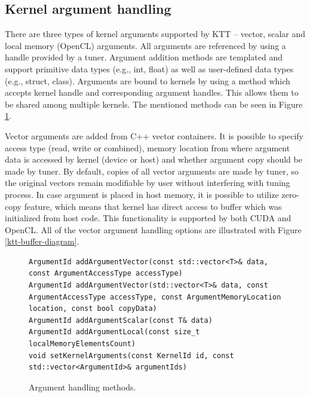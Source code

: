 \documentclass
[
    digital, %
    oneside, %
    table, %
    nolof, %
    nolot, %
    nocover %
]{fithesis3}
\begin{document}
\subsection{Kernel argument handling}
There are three types of kernel arguments supported by KTT -- vector, scalar and local memory (OpenCL) arguments. All arguments are referenced by using
a handle provided by a tuner. Argument addition methods are templated and support primitive data types (e.g., int, float) as well as user-defined data
types (e.g., struct, class). Arguments are bound to kernels by using a method which accepts kernel handle and corresponding argument handles. This allows
them to be shared among multiple kernels. The mentioned methods can be seen in Figure \ref{ktt-argument-methods}.

Vector arguments are added from C++ vector containers. It is possible to specify access type (read, write or combined), memory location from where
argument data is accessed by kernel (device or host) and whether argument copy should be made by tuner. By default, copies of all vector arguments
are made by tuner, so the original vectors remain modifiable by user without interfering with tuning process. In case argument is placed in host
memory, it is possible to utilize zero-copy feature, which means that kernel has direct access to buffer which was initialized from host code. This
functionality is supported by both CUDA and OpenCL. All of the vector argument handling options are illustrated with Figure \ref{ktt-buffer-diagram}.

\begin{figure}
\begin{adjustwidth}{-1cm}{-1cm}
\begin{lstlisting}
ArgumentId addArgumentVector(const std::vector<T>& data, const ArgumentAccessType accessType)
ArgumentId addArgumentVector(std::vector<T>& data, const ArgumentAccessType accessType, const ArgumentMemoryLocation location, const bool copyData)
ArgumentId addArgumentScalar(const T& data)
ArgumentId addArgumentLocal(const size_t localMemoryElementsCount)
void setKernelArguments(const KernelId id, const std::vector<ArgumentId>& argumentIds)
\end{lstlisting}
\caption{Argument handling methods.}
\label{ktt-argument-methods}
\end{adjustwidth}
\end{figure}
\end{document}
